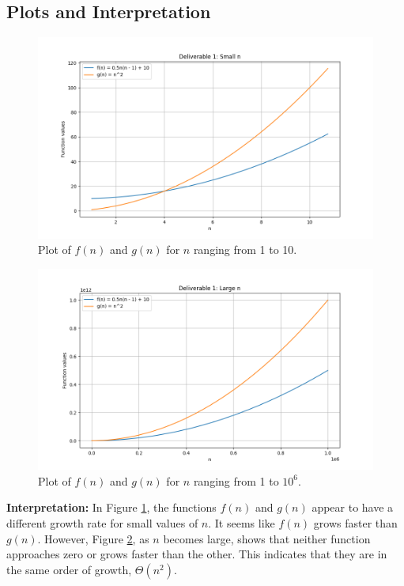 \documentclass{article}
\begin{document}
\subsection{Plots and Interpretation}

\begin{figure}[H]
    \centering
    \includegraphics[width=\textwidth]{plot_deliverable1_smalln.png}
    \caption{Plot of $f(n)$ and $g(n)$ for $n$ ranging from 1 to 10.}
    \label{fig:fn_gn_1_10}
\end{figure}

\begin{figure}[H]
    \centering
    \includegraphics[width=\textwidth]{plot_deliverable1_largen.png}
    \caption{Plot of $f(n)$ and $g(n)$ for $n$ ranging from 1 to $10^6$.}
    \label{fig:fn_gn_1_10e6}
\end{figure}

\textbf{Interpretation:} In Figure \ref{fig:fn_gn_1_10}, the functions $f(n)$ and $g(n)$ appear to have a different growth rate for small values of $n$. It seems like $f(n)$ grows faster than $g(n)$. However, Figure \ref{fig:fn_gn_1_10e6}, as $n$ becomes large, shows that neither function approaches zero or grows faster than the other. This indicates that they are in the same order of growth, $\Theta(n^2)$.
\end{document}

